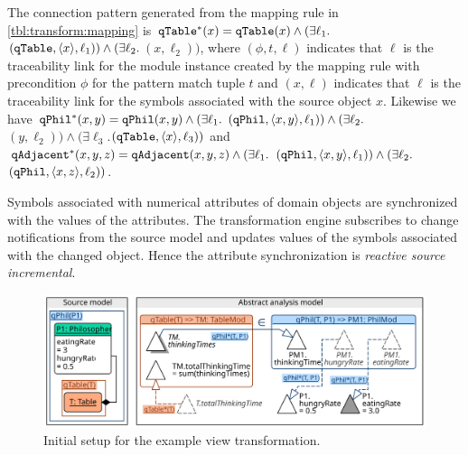 \begin{runningExample}
  The connection pattern generated from the mapping rule  in \vref{tbl:transform:mapping} is \(\texttt{\upshape qTable}^*(x) = \texttt{\upshape qTable}(x) \land (\exists \ell_1 .\)\((\texttt{\upshape qTable}, \langle x \rangle, \ell_1)) \land (\exists \ell_2 .\)\((x, \ell_2))\), where \((\phi, t, \ell)\) indicates that \(\ell\) is the traceability link for the  module instance created by the mapping rule with precondition \(\phi\) for the pattern match tuple \(t\) and \((x, \ell)\) indicates that \(\ell\) is the traceability link for the symbols associated with the source object \(x\). Likewise we have \(\texttt{\upshape qPhil}^*(x, y) = \texttt{\upshape qPhil}(x, y) \land (\exists \ell_1 .\)\((\texttt{\upshape qPhil}, \langle x, y \rangle, \ell_1)) \land (\exists \ell_2 .\)\((y, \ell_2)) \land (\exists \ell_3 .\)\((\texttt{\upshape qTable}, \langle x \rangle, \ell_3))\) and \(\texttt{\upshape qAdjacent}^*(x, y, z) = \texttt{\upshape qAdjacent}(x, y, z) \land (\exists \ell_1 .\)\((\texttt{\upshape qPhil}, \langle x, y \rangle, \ell_1)) \land (\exists \ell_2 .\)\((\texttt{\upshape qPhil}, \langle x, z \rangle, \ell_2))\).
\end{runningExample}

Symbols associated with numerical attributes of domain objects are synchronized with the values of the attributes. The transformation engine subscribes to change notifications from the source model and updates values of the symbols associated with the changed object. Hence the attribute synchronization is \emph{reactive source incremental}.

\begin{figure}
  \centering
  \includegraphics[scale=0.9]{figures/view_transformation_example_initial} 
  \caption{Initial setup for the example view transformation.}
  \label{fig:transform:view-1}
\end{figure}

